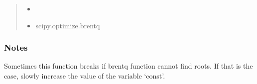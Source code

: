 \documentclass[letterpaper,10pt,english]{sphinxmanual}
\begin{document}
\begin{fulllineitems}
\begin{quote}
\begin{description}
\begin{itemize}
\item {} 
\sphinxAtStartPar
{}

\item {} 
\sphinxAtStartPar
{} \textendash{} scipy.optimize.brentq

\end{itemize}


\end{description}\end{quote}
\subsubsection*{Notes}

\sphinxAtStartPar
Sometimes this function breaks if brentq function cannot find
roots. If that is the case, slowly increase the value of the
variable ‘const’.

\end{fulllineitems}

\end{document}
